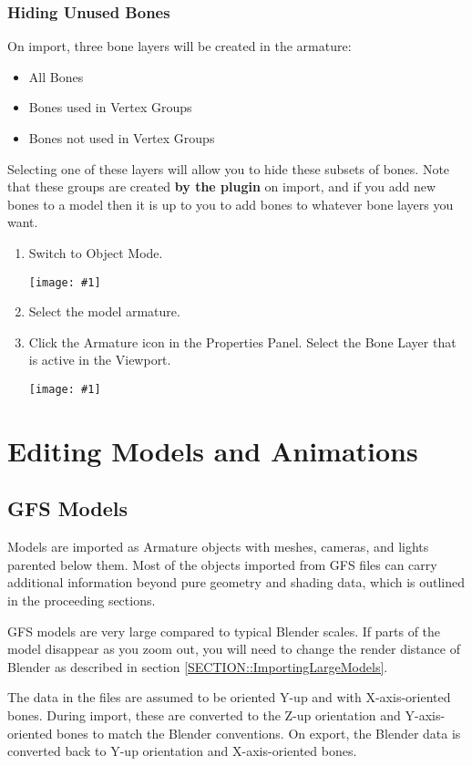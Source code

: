 \documentclass{article}
\newenvironment{guide}[1]
{
	\begin{center}
		\begin{tcolorbox}[%
			colback=black!20, 
			boxrule=0pt, 
			title=Step-by-step: #1,
			enhanced,
			breakable,
			overlay unbroken={%
                \draw[line width=1pt, black, rounded corners]
        	    (frame.north west) rectangle (frame.south east);
			},
    		overlay first={%
        		 \draw[line width=1pt, black, rounded corners]
        	    (frame.south west) -- (frame.north west) -- (frame.north east) -- (frame.south east);
                \draw[line width=1pt, black]
                (frame.south west) -- (frame.south east);
            },
    		overlay middle={%
                \draw[line width=1pt, black]
        	    (frame.north west) rectangle (frame.south east);
        	},
    		overlay last={%
                \draw[line width=1pt, black, rounded corners]
        	    (frame.north west) -- (frame.south west) -- (frame.south east) -- (frame.north east);
                \draw[line width=1pt, black]
                (frame.north west) -- (frame.north east);
           	}
        ]{}
    	\begin{enumerate}
}
{
    		\end{enumerate}
    	\end{tcolorbox}
	\end{center}  	 
}
\newcommand{\guideimage}[1]
{
	\begin{center}
		\texttt{[image: \#1]}
	\end{center}
}
\begin{document}
\subsubsection{Hiding Unused Bones}
On import, three bone layers will be created in the armature:
\begin{itemize}
\item All Bones
\item Bones used in Vertex Groups
\item Bones not used in Vertex Groups
\end{itemize}
Selecting one of these layers will allow you to hide these subsets of bones. Note that these groups are created \textbf{by the plugin} on import, and if you add new bones to a model then it is up to you to add bones to whatever bone layers you want.

\begin{guide}{Selecting Bone Layers}
\item Switch to Object Mode.
\guideimage{images/import/import_to_object_mode.png}
\item Select the model armature.
\item Click the Armature icon in the Properties Panel. Select the Bone Layer that is active in the Viewport.
\guideimage{images/import/import_bone_layer_select.png}
\end{guide}

\clearpage

\section{Editing Models and Animations}
\subsection{GFS Models}
Models are imported as Armature objects with meshes, cameras, and lights parented below them. Most of the objects imported from GFS files can carry additional information beyond pure geometry and shading data, which is outlined in the proceeding sections.

GFS models are very large compared to typical Blender scales. If parts of the model disappear as you zoom out, you will need to change the render distance of Blender as described in section \ref{SECTION::ImportingLargeModels}.

The data in the files are assumed to be oriented Y-up and with X-axis-oriented bones. During import, these are converted to the Z-up orientation and Y-axis-oriented bones to match the Blender conventions. On export, the Blender data is converted back to Y-up orientation and X-axis-oriented bones. 
\end{document}

